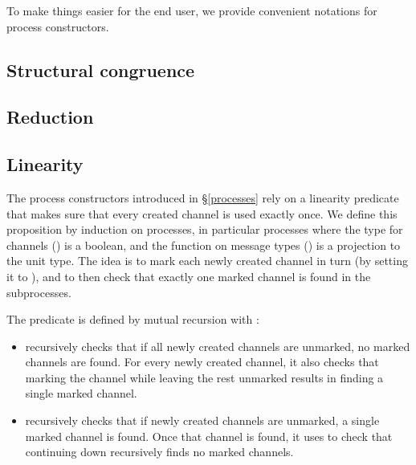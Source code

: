\documentclass{mproj}
\begin{document}

To make things easier for the end user, we provide convenient notations for process constructors.


\subsection{Structural congruence}\label{structural-congruence}

\subsection{Reduction}\label{reduction}

\subsection{Linearity}\label{linearity}

The process constructors introduced in \S \ref{processes} rely on a linearity predicate that makes sure that every created channel is used exactly once. We define this proposition by induction on processes, in particular processes where the type for channels () is a boolean, and the function on message types () is a projection to the unit type. The idea is to mark each newly created channel in turn (by setting it to ), and to then check that exactly one marked channel is found in the subprocesses.


The predicate  is defined by mutual recursion with :
\begin{itemize}
    \item {} recursively checks that if all newly created channels are unmarked, no marked channels are found. For every newly created channel, it also checks that marking the channel while leaving the rest unmarked results in  finding a single marked channel.  

    \item {} recursively checks that if newly created channels are unmarked, a single marked channel is found. Once that channel is found, it uses  to check that continuing down recursively finds no marked channels.
\end{itemize}
\end{document}
